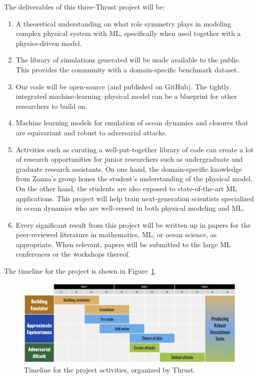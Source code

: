 \documentclass[11pt]{article}
\begin{document}
The deliverables of this three-Thrust project will be:
\begin{enumerate}
    \item A theoretical understanding on what role symmetry plays in modeling complex physical system with ML, specifically when used together with a physics-driven model.
    \item The library of simulations generated will be made available to the public. This provides the community with a domain-specific benchmark dataset.
    \item Our code will be open-source (and published on GitHub). The tightly integrated machine-learning--physical model can be a blueprint for other researchers to build on.
    \item Machine learning models for emulation of ocean dynamics and closures that are equivariant and robust to adversarial attacks.
    \item Activities such as curating a well-put-together library of code can create a lot of research opportunities for junior researchers such as undergraduate and graduate research assistants. On one hand, the domain-specific knowledge from Zanna's group hones the student's understanding of the physical model. On the other hand, the students are also exposed to state-of-the-art ML applications. This project will help train next-generation scientists specialized in ocean dynamics who are well-versed in both physical modeling and ML.
    \item Every significant result from this project will be written up in papers for the peer-reviewed literature in mathematics, ML, or ocean science, as appropriate. When relevant, papers will be submitted to the large ML conferences or the workshops thereof. 
\end{enumerate}
The timeline for the project is shown in Figure~\ref{fig:timeline}.

\begin{figure}
    \centering
    \includegraphics[width=0.9\linewidth]{figures/ONR_gnatt_chart.png}
    \caption{Timeline for the project activities, organized by Thrust.}
    \label{fig:timeline}
\end{figure}
\end{document}

